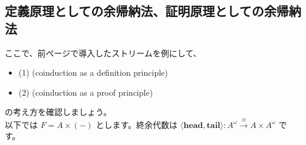 \documentclass[
		head_space=20mm,
		foot_space=20mm,
		gutter=10mm,
		line_length=190mm
]{jlreq}
\begin{document}
\clearpage

\subsection{定義原理としての余帰納法、証明原理としての余帰納法}

\noindent ここで、前ページで導入したストリームを例にして、
\begin{itemize}
	\item (1)  (coinduction as a definition principle)
	\item (2)  (coinduction as a proof principle)
\end{itemize}
の考え方を確認しましょう。\\
以下では %
$F=A\times(-)$ とします。終余代数は $\langle \mathbf{head},\mathbf{tail}\rangle:A^\omega\xrightarrow{\;\cong\;} A\times A^\omega$ です。\\
\end{document}
